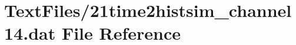 \hypertarget{21time2histsim__channel14_8dat}{}\section{Text\+Files/21time2histsim\+\_\+channel14.dat File Reference}
\label{21time2histsim__channel14_8dat}
